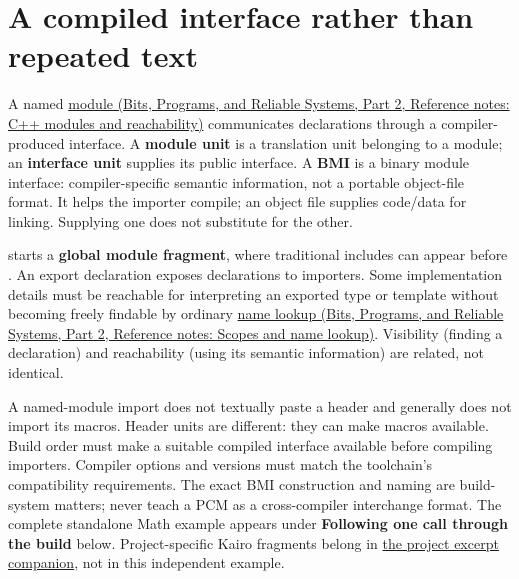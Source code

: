 \section{A compiled interface rather than repeated text}\label{05-engine-i-ch002-a-compiled-interface-rather-than-repeated-text}

\hypertarget{05-engine-i-ch002-a-compiled-interface-rather-than-repeated-text}{}

A named \href{../01-Bits-Programs-and-Reliable-Systems-P02/main.pdf\#nameddest=appendix-410a611a5b8d}{module (Bits, Programs, and Reliable Systems, Part 2, Reference notes: C++ modules and reachability)} communicates declarations through a compiler-produced interface. A \textbf{module unit} is a translation unit belonging to a module; an \textbf{interface unit} supplies its public interface. A \textbf{BMI} is a binary module interface: compiler-specific semantic information, not a portable object-file format. It helps the importer compile; an object file supplies code/data for linking. Supplying one does not substitute for the other.

 starts a \textbf{global module fragment}, where traditional includes can appear before . An export declaration exposes declarations to importers. Some implementation details must be reachable for interpreting an exported type or template without becoming freely findable by ordinary \href{../01-Bits-Programs-and-Reliable-Systems-P02/main.pdf\#nameddest=appendix-b12b31759da1}{name lookup (Bits, Programs, and Reliable Systems, Part 2, Reference notes: Scopes and name lookup)}. Visibility (finding a declaration) and reachability (using its semantic information) are related, not identical.

A named-module import does not textually paste a header and generally does not import its macros. Header units are different: they can make macros available. Build order must make a suitable compiled interface available before compiling importers. Compiler options and versions must match the toolchain's compatibility requirements. The exact BMI construction and naming are build-system matters; never teach a PCM as a cross-compiler interchange format. The complete standalone Math example appears under \textbf{Following one call through the build} below. Project-specific Kairo fragments belong in \hyperref[appendix-4e2236f53445-source-reported-c-project-excerpts]{the project excerpt companion}, not in this independent example.

